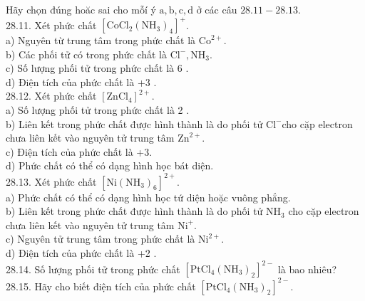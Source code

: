 \documentclass[10pt]{article}
\begin{document}
Hãy chọn đúng hoăc sai cho mỗí ý $\mathrm{a}, \mathrm{b}, \mathrm{c}, \mathrm{d}$ ở các câu $28.11-28.13$.\\
28.11. Xét phức chất $\left[\mathrm{CoCl}_{2}\left(\mathrm{NH}_{3}\right)_{4}\right]^{+}$.\\
a) Nguyên từ trung tâm trong phức chất là $\mathrm{Co}^{2+}$.\\
b) Các phối tử có trong phức chất là $\mathrm{Cl}^{-}, \mathrm{NH}_{3}$.\\
c) Số lượng phối tử trong phức chất là 6 .\\
d) Điện tích của phức chất là +3 .\\
28.12. Xét phức chất $\left[\mathrm{ZnCl}_{4}\right]^{2+}$.\\
a) Số lượng phối tử trong phức chất là 2 .\\
b) Liên kết trong phức chất được hình thành là do phối tử $\mathrm{Cl}^{-}$cho cặp electron chưa liên kết vào nguyên tử trung tâm $\mathrm{Zn}^{2+}$.\\
c) Điện tích của phức chất là +3.\\
d) Phức chất có thể có dạng hình học bát diện.\\
28.13. Xét phức chất $\left[\mathrm{Ni}\left(\mathrm{NH}_{3}\right)_{6}\right]^{2+}$.\\
a) Phức chất có thể có dạng hình học tứ diện hoặc vuông phẳng.\\
b) Liên kết trong phức chất được hình thành là do phối tử $\mathrm{NH}_{3}$ cho cặp electron chưa liên kết vào nguyên tử trung tâm $\mathrm{Ni}^{+}$.\\
c) Nguyên tử trung tâm trong phức chất là $\mathrm{Ni}^{2+}$.\\
d) Điện tích của phức chất là +2 .\\
28.14. Số lượng phối tử trong phức chất $\left[\mathrm{PtCl}_{4}\left(\mathrm{NH}_{3}\right)_{2}\right]^{2-}$ là bao nhiêu?\\
28.15. Hãy cho biết điện tích của phức chất $\left[\mathrm{PtCl}_{4}\left(\mathrm{NH}_{3}\right)_{2}\right]^{2-}$.
\end{document}
